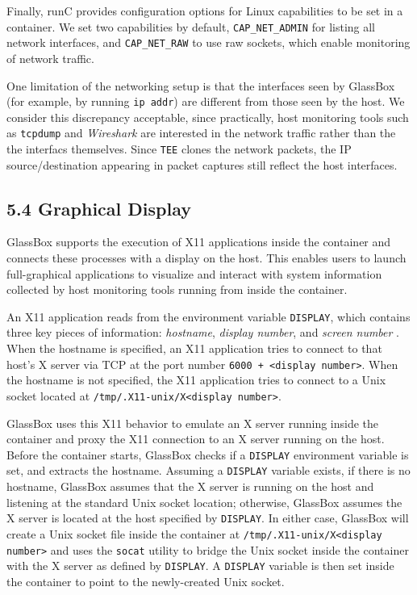\documentclass{proc}
\begin{document}
Finally, runC provides configuration options for Linux capabilities to be set in a container. We set two capabilities by default, \texttt{CAP\_NET\_ADMIN} for listing all network interfaces, and \texttt{CAP\_NET\_RAW} to use raw sockets, which enable monitoring of network traffic.

One limitation of the networking setup is that the interfaces seen by GlassBox (for example, by running \texttt{ip addr}) are different from those seen by the host. We consider this discrepancy acceptable, since practically, host monitoring tools such as \texttt{tcpdump} and \textit{Wireshark} are interested in the network traffic rather than the the interfacs themselves. Since \texttt{TEE} clones the network packets, the IP source/destination appearing in packet captures still reflect the host interfaces.

\subsection*{5.4 Graphical Display}

GlassBox supports the execution of X11 applications inside the container and connects these processes with a display on the host. This enables users to launch full-graphical applications to visualize and interact with system information collected by host monitoring tools running from inside the container.

An X11 application reads from the environment variable \texttt{DISPLAY}, which contains three key pieces of information: \textit{hostname}, \textit{display number}, and \textit{screen number} \cite{xman}. When the hostname is specified, an X11 application tries to connect to that host's X server via TCP at the port number \texttt{6000 + <display number>}. When the hostname is not specified, the X11 application tries to connect to a Unix socket located at \texttt{/tmp/.X11-unix/X<display number>}.

GlassBox uses this X11 behavior to emulate an X server running inside the container and proxy the X11 connection to an X server running on the host. Before the container starts, GlassBox checks if a \texttt{DISPLAY} environment variable is set, and extracts the hostname. Assuming a \texttt{DISPLAY} variable exists, if there is no hostname, GlassBox assumes that the X server is running on the host and listening at the standard Unix socket location; otherwise, GlassBox assumes the X server is located at the host specified by \texttt{DISPLAY}. In either case, GlassBox will create a Unix socket file inside the container at \texttt{/tmp/.X11-unix/X<display number>} and uses the \texttt{socat} utility \cite{socatman} to bridge the Unix socket inside the container with the X server as defined by \texttt{DISPLAY}. A \texttt{DISPLAY} variable is then set inside the container to point to the newly-created Unix socket.
\end{document}
